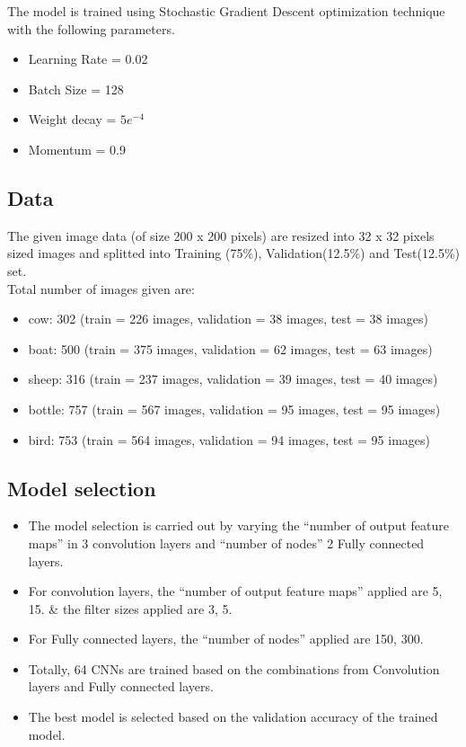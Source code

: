 \documentclass[fleqn]{article}
\begin{document}
The model is trained using Stochastic Gradient Descent optimization technique with the following parameters.\\

\begin{itemize}
  \item Learning Rate = 0.02
  \item Batch Size = 128
  \item Weight decay = $5e^{-4}$
  \item Momentum = 0.9
\end{itemize}

\subsection{Data}

The given image data (of size 200 x 200 pixels) are resized into 32 x 32 pixels sized images and splitted into Training (75\%), Validation(12.5\%) and Test(12.5\%) set. \\

Total number of images given are: \\

\begin{itemize}
  \item cow: 302 (train = 226 images, validation = 38 images, test = 38 images)
  \item boat: 500 (train = 375 images, validation = 62 images, test = 63 images)
  \item sheep: 316 (train = 237 images, validation = 39 images, test = 40 images)
  \item bottle: 757 (train = 567 images, validation = 95 images, test = 95 images)
  \item bird: 753 (train = 564 images, validation = 94 images, test = 95 images)
\end{itemize}

\subsection{Model selection}

\begin{itemize}
  \item The model selection is carried out by varying the ``number of output feature maps'' in 3 convolution layers and ``number of nodes'' 2 Fully connected layers.
  \item For convolution layers, the ``number of output feature maps'' applied are 5, 15. \& the filter sizes applied are 3, 5.
  \item For Fully connected layers, the ``number of nodes'' applied are 150, 300.
  \item Totally, 64 CNNs are trained based on the combinations from Convolution layers and Fully connected layers.
  \item The best model is selected based on the validation accuracy of the trained model.
\end{itemize}
\end{document}
